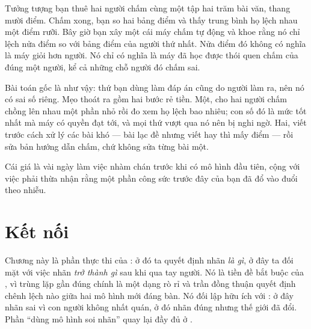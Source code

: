 \documentclass[../../deep_learning.tex]{subfiles}
\begin{document}
\begin{dongian}
Tưởng tượng bạn thuê hai người chấm cùng một tập hai trăm bài văn, thang mười điểm. Chấm xong, bạn so hai bảng điểm và thấy trung bình họ lệch nhau một điểm rưỡi. Bây giờ bạn xây một cái máy chấm tự động và khoe rằng nó chỉ lệch nửa điểm so với bảng điểm của người thứ nhất. Nửa điểm đó không có nghĩa là máy giỏi hơn người. Nó chỉ có nghĩa là máy đã học được thói quen chấm của đúng một người, kể cả những chỗ người đó chấm sai.

Bài toán gốc là như vậy: thứ bạn dùng làm đáp án cũng do người làm ra, nên nó có sai số riêng. Mẹo thoát ra gồm hai bước rẻ tiền. Một, cho hai người chấm chồng lên nhau một phần nhỏ rồi đo xem họ lệch bao nhiêu; con số đó là mức tốt nhất mà máy có quyền đạt tới, và mọi thứ vượt qua nó nên bị nghi ngờ. Hai, viết trước cách xử lý các bài khó --- bài lạc đề nhưng viết hay thì mấy điểm --- rồi sửa bản hướng dẫn chấm, chứ không sửa từng bài một.

Cái giá là vài ngày làm việc nhàm chán trước khi có mô hình đầu tiên, cộng với việc phải thừa nhận rằng một phần công sức trước đây của bạn đã đổ vào đuổi theo nhiễu.

\end{dongian}

\section{Kết nối}
Chương này là phần thực thi của : ở đó ta quyết định nhãn \emph{là gì}, ở đây ta đối mặt với việc nhãn \emph{trở thành gì} sau khi qua tay người. Nó là tiền đề bắt buộc của , vì trùng lặp gần đúng chính là một dạng rò rỉ và trần đồng thuận quyết định chênh lệch nào giữa hai mô hình mới đáng bàn. Nó đối lập hữu ích với : ở đây nhãn sai vì con người không nhất quán, ở đó nhãn đúng nhưng thế giới đã đổi. Phần ``dùng mô hình soi nhãn'' quay lại đầy đủ ở .
\end{document}
